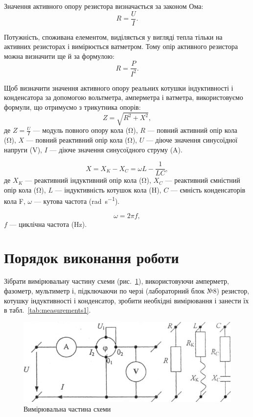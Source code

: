 \documentclass[a4paper,oneside,DIV=12,12pt]{scrartcl}
\begin{document}
		Значення активного опору резистора визначається за законом Ома:
		\[
			R = \frac{U}{I}.
		\]
		
		Потужність, споживана елементом, виділяється у вигляді тепла тільки на активних резисторах і вимірюється ватметром. Тому опір активного резистора можна визначити ще й за формулою:
		\[
			R = \frac{P}{I^2}.
		\]
		
		Щоб визначити значення активного опору реальних котушки індуктивності і конденсатора за допомогою вольтметра, амперметра і ватметра, використовуємо формули, що отримуємо з трикутника опорів:
		\[
			Z = \sqrt{R^2 + X^2},
		\]
		де $Z = \frac{U}{I}$ --- модуль повного опору кола (\si{\ohm}), $R$ --- повний активний опір кола (\si{\ohm}), $X$ --- повний реактивний опір кола (\si{\ohm}), $U$ --- діюче значення синусоїдної напруги (\si{\volt}), $I$ --- діюче значення синусоїдного струму (\si{\ampere}).
		
		\[
			X = X_K - X_C = \omega L - \frac{1}{LC},
		\]
		де $X_K$ --- реактивний індуктивний опір кола (\si{\ohm}), $X_C$ --- реактивний ємністний опір кола (\si{\ohm}), $L$ --- індуктивність котушок кола (\si{\henry}), $C$ --- ємність конденсаторів кола {\si{\farad}}, $\omega$ --- кутова частота (\si{\radian\per\second}).
		
		\[
			\omega = 2 \pi f,
		\]
		$f$ --- циклічна частота (\si{\hertz}).
		
	\section{Порядок виконання роботи}
		Зібрати вимірювальну частину схеми (рис.~\ref{fig:schematic}), використовуючи амперметр, фазометр, мультиметр і, підключаючи по черзі (лабораторний блок №8) резистор, котушку індуктивності і конденсатор, зробити необхідні вимірювання і занести їх в табл.~\ref{tab:measurements1}. 
		
		\begin{figure}[!htbp]
		\centering
			\includegraphics[height = 6\baselineskip]{assets/schematic.png}
		\caption{Вимірювальна частина схеми}
		\label{fig:schematic}
		\end{figure}
		
\end{document}
